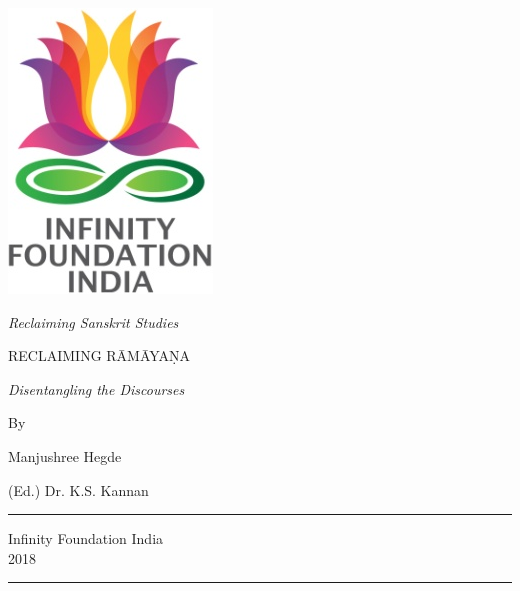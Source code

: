 \thispagestyle{empty}
\begin{center}
\includegraphics[scale=0.3]{figures/logo.png}
\bigskip

{\fontsize{10}{14}\selectfont\sl
Reclaiming Sanskrit Studies}
\end{center}
\bigskip

\begin{center}
{\fontsize{20}{24}\selectfont RECLAIMING RĀMĀYAṆA}\\[6pt]
\bigskip

{\sl\small Disentangling the Discourses}

\vfill

{\fontsize{12}{14}\selectfont 
By\par
}

{\fontsize{14}{18}\selectfont 
Manjushree Hegde\par
}

\bigskip
\bigskip

{\fontsize{14}{18}\selectfont 
(Ed.) Dr. K.S. Kannan\par
}
\vfill

\rule{5cm}{1pt}

{\fontsize{12}{14}\selectfont
Infinity Foundation India\\[4pt]
2018}

\rule{5cm}{1pt}
\end{center}




